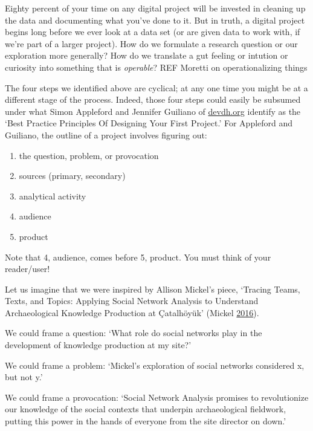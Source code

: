 \documentclass[english,]{book}
\providecommand{\tightlist}{%
  \setlength{\itemsep}{0pt}\setlength{\parskip}{0pt}}
\begin{document}
Eighty percent of your time on any digital project will be invested in
cleaning up the data and documenting what you've done to it. But in
truth, a digital project begins long before we ever look at a data set
(or are given data to work with, if we're part of a larger project). How
do we formulate a research question or our exploration more generally?
How do we translate a gut feeling or intution or curiosity into
something that is \emph{operable}? REF Moretti on operationalizing
things

The four steps we identified above are cyclical; at any one time you
might be at a different stage of the process. Indeed, those four steps
could easily be subsumed under what Simon Appleford and Jennifer
Guiliano of \href{http://devdh.org}{devdh.org} identify as the `Best
Practice Principles Of Designing Your First Project.' For Appleford and
Guiliano, the outline of a project involves figuring out:

\begin{enumerate}
\def\labelenumi{\arabic{enumi}.}
\tightlist
\item
  the question, problem, or provocation
\item
  sources (primary, secondary)
\item
  analytical activity
\item
  audience
\item
  product
\end{enumerate}

Note that 4, audience, comes before 5, product. You must think of your
reader/user!

Let us imagine that we were inspired by Allison Mickel's piece, `Tracing
Teams, Texts, and Topics: Applying Social Network Analysis to Understand
Archaeological Knowledge Production at Çatalhöyük' (Mickel
\protect\hyperlink{ref-mickel_tracing_2016}{2016}).

We could frame a question: `What role do social networks play in the
development of knowledge production at my site?'

We could frame a problem: `Mickel's exploration of social networks
considered x, but not y.'

We could frame a provocation: `Social Network Analysis promises to
revolutionize our knowledge of the social contexts that underpin
archaeological fieldwork, putting this power in the hands of everyone
from the site director on down.'
\end{document}
